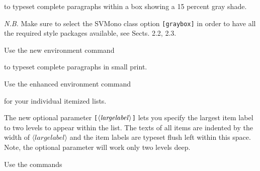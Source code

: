 \documentclass[graybox,square]{svmono}
\begin{document}
\begin{sloppy}
to typeset complete paragraphs within a box showing a 15 percent gray shade.

{\it N.B.} Make sure to select the {\sc SVMono} class option \verb|[graybox]| in order to have all the required style packages available, see Sects. 2.2, 2.3. 

Use the new environment command

\cprotect{}

to typeset complete paragraphs in small print.

Use the enhanced environment command

\cprotect{}

for your individual itemized lists.

The new optional parameter \verb|[|$\langle {\it largelabel}\rangle$\verb|]| lets you specify the largest item label to two levels to appear within the list. The texts of all items are indented by the width of $\langle largelabel\rangle$ and the item labels are typeset flush left within this space. Note, the optional parameter will work only two levels deep.

\pagebreak

Use the commands

\cprotect{}


\end{sloppy}
\end{document}
